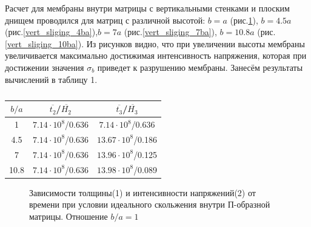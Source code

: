 		Расчет для мембраны внутри матрицы с вертикальными стенками и плоским днищем проводился для матриц с различной высотой:
		$b = a$ (рис.\ref{vert_sliging_ba}), $b = 4.5a$ (рис.\ref{vert_sliging_4ba}),$b=7a$ (рис.\ref{vert_sliging_7ba}), $b=10.8a$ (рис.\ref{vert_sliging_10ba}). Из рисунков видно, что при увеличении высоты мембраны увеличивается максимально достижимая интенсивность напряжения, которая при достижении значения $\sigma_b$ приведет к разрушению мембраны. Занесём результаты вычислений в таблицу 1.
\begin{table}
\begin{center}

\renewcommand{\arraystretch}{2}

\begin{tabular}{|c|c|c|}
\hline
$b/a$    & $\overline{t_2}$/$\overline{H_2}$ & $\overline{t_3}$/$\overline{H_3}$ \\
\hline\hline
1    & $7.14\cdot10^8$/0.636  & $7.14\cdot10^8$/0.636\\ \hline
4.5  & $7.14\cdot10^8$/0.636  & $13.67\cdot10^8$/0.186\\ \hline
7    & $7.14\cdot10^8$/0.636  & $13.96\cdot10^8$/0.125\\ \hline
10.8   & $7.14\cdot10^8$/0.636  & $13.98\cdot10^8$/0.089\\ \hline
\end{tabular}

\end{center}
\label{vert_table}
\caption{}
\end{table}				 
		\begin{figure}[h!]	
				\def\svgwidth{\columnwidth}
				\caption{Зависимости толщины(1) и интенсивности напряжений(2) от времени при условии идеального скольжения внутри П-образной матрицы. Отношение $b/a = 1$} 
				\label{vert_sliging_ba}
		\end{figure}

